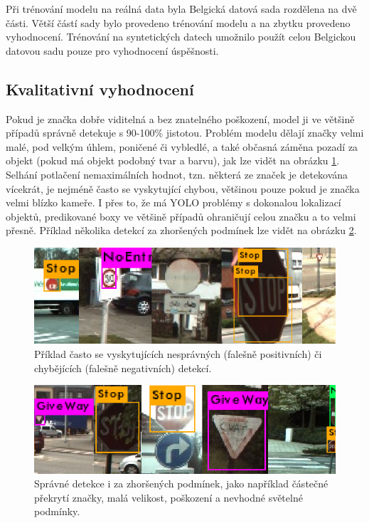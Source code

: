 \documentclass[czech]{ExcelAtFIT} %
\begin{document}
Při trénování modelu na reálná data byla Belgická datová sada rozdělena na dvě části. Větší částí sady bylo provedeno trénování modelu a na zbytku provedeno vyhodnocení. Trénování na syntetických datech umožnilo použít celou Belgickou datovou sadu pouze pro vyhodnocení úspěšnosti.


\subsection{Kvalitativní vyhodnocení}
Pokud je značka dobře viditelná a bez znatelného poškození, model ji ve většině případů správně detekuje s 90-100\% jistotou. Problém modelu dělají značky velmi malé, pod velkým úhlem, poničené či vybledlé, a také občasná záměna pozadí za objekt (pokud má objekt podobný tvar a barvu), jak lze vidět na obrázku \ref{fig:spatneDetekce}. Selhání potlačení nemaximálních hodnot, tzn. některá ze značek je detekována vícekrát, je nejméně často se vyskytující chybou, většinou pouze pokud je značka velmi blízko kameře. I přes to, že má YOLO problémy s dokonalou lokalizací objektů, predikované boxy ve většině případů ohraničují celou značku a to velmi přesně. Příklad několika detekcí za zhoršených podmínek lze vidět na obrázku \ref{fig:spravneDetekce}.

\begin{figure}[t]\centering
    \centering
    \includegraphics[width=0.99\linewidth]{images/spatne_detekce.png}
    \caption{Příklad často se vyskytujících nesprávných (falešně positivních) či chybějících (falešně negativních) detekcí.}
    \label{fig:spatneDetekce}
\end{figure}

\begin{figure}[t]\centering
    \centering
    \includegraphics[width=0.99\linewidth]{images/spravne_detekce.png}
    \caption{Správné detekce i za zhoršených podmínek, jako například částečné překrytí značky, malá velikost, poškození a nevhodné světelné podmínky.}
    \label{fig:spravneDetekce}
\end{figure}
\end{document}
